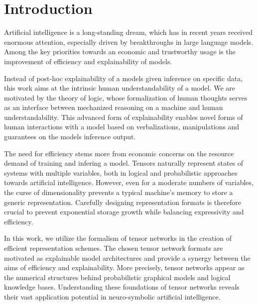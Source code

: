 \chapter{Introduction}\label{cha:introduction}

Artificial intelligence is a long-standing dream, which has in recent years received enormous attention, especially driven by breakthroughs in large language models.
Among the key priorities towards an economic and trustworthy usage is the improvement of efficiency and explainability of models.

Instead of post-hoc explainability of a models given inference on specific data, this work aims at the intrinsic human understandability of a model.
We are motivated by the theory of logic, whose formalization of human thoughts serves as an interface between mechanized reasoning on a machine and human understandability.
This advanced form of explainability enables novel forms of human interactions with a model based on verbalizations, manipulations and guarantees on the models inference output.

The need for efficiency stems more from economic concerns on the resource demand of training and infering a model.
Tensors naturally represent states of systems with multiple variables, both in logical and probabilistic approaches towards artificial intelligence. %
However, even for a moderate numbers of variables, the curse of dimensionality prevents a typical machine’s memory to store a generic representation.
Carefully designing representation formats is therefore crucial to prevent exponential storage growth while balancing expressivity and efficiency.

In this work, we utilize the formalism of tensor networks in the creation of efficient representation schemes.
The chosen tensor network formats are motivated as explainable model architectures and provide a synergy between the aims of efficiency and explainability.
More precisely, tensor networks appear as the numerical structures behind probabilistic graphical models and logical knowledge bases.
Understanding these foundations of tensor networks reveals their vast application potential in neuro-symbolic artificial intelligence.

